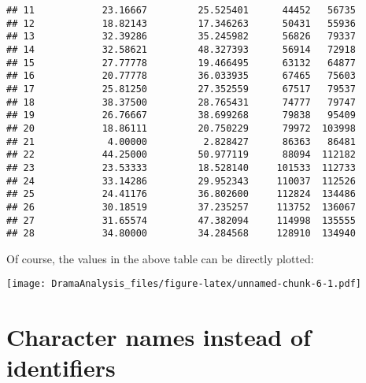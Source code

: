 \documentclass[]{book}
\newenvironment{Shaded}{\begin{snugshade}}{\end{snugshade}}
\newcommand{\CommentTok}[1]{\textcolor[rgb]{0.56,0.35,0.01}{\textit{#1}}}
\newcommand{\DataTypeTok}[1]{\textcolor[rgb]{0.13,0.29,0.53}{#1}}
\newcommand{\DecValTok}[1]{\textcolor[rgb]{0.00,0.00,0.81}{#1}}
\newcommand{\KeywordTok}[1]{\textcolor[rgb]{0.13,0.29,0.53}{\textbf{#1}}}
\newcommand{\NormalTok}[1]{#1}
\newcommand{\OperatorTok}[1]{\textcolor[rgb]{0.81,0.36,0.00}{\textbf{#1}}}
\newcommand{\OtherTok}[1]{\textcolor[rgb]{0.56,0.35,0.01}{#1}}
\newcommand{\StringTok}[1]{\textcolor[rgb]{0.31,0.60,0.02}{#1}}
\begin{document}
\begin{verbatim}
## 11            23.16667         25.525401      44452   56735
## 12            18.82143         17.346263      50431   55936
## 13            32.39286         35.245982      56826   79337
## 14            32.58621         48.327393      56914   72918
## 15            27.77778         19.466495      63132   64877
## 16            20.77778         36.033935      67465   75603
## 17            25.81250         27.352559      67517   79537
## 18            38.37500         28.765431      74777   79747
## 19            26.76667         38.699268      79838   95409
## 20            18.86111         20.750229      79972  103998
## 21             4.00000          2.828427      86363   86481
## 22            44.25000         50.977119      88094  112182
## 23            23.53333         18.528140     101533  112733
## 24            33.14286         29.952343     110037  112526
## 25            24.41176         36.802600     112824  134486
## 26            30.18519         37.235257     113752  136067
## 27            31.65574         47.382094     114998  135555
## 28            34.80000         34.284568     128910  134940
\end{verbatim}

Of course, the values in the above table can be directly plotted:

\begin{Shaded}
\end{Shaded}

\texttt{[image: DramaAnalysis\_files/figure-latex/unnamed-chunk-6-1.pdf]}

\hypertarget{format}{%
\section{Character names instead of identifiers}\label{format}}
\end{document}
